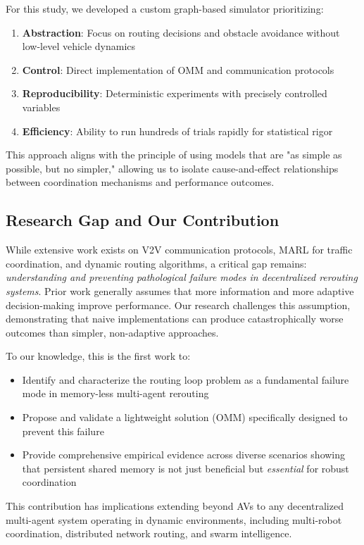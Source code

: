 \documentclass[conference]{IEEEtran}
\begin{document}
For this study, we developed a custom graph-based simulator prioritizing:
\begin{enumerate}
    \item \textbf{Abstraction}: Focus on routing decisions and obstacle avoidance without low-level vehicle dynamics
    \item \textbf{Control}: Direct implementation of OMM and communication protocols
    \item \textbf{Reproducibility}: Deterministic experiments with precisely controlled variables
    \item \textbf{Efficiency}: Ability to run hundreds of trials rapidly for statistical rigor
\end{enumerate}

This approach aligns with the principle of using models that are "as simple as possible, but no simpler," allowing us to isolate cause-and-effect relationships between coordination mechanisms and performance outcomes.

\subsection{Research Gap and Our Contribution}

While extensive work exists on V2V communication protocols, MARL for traffic coordination, and dynamic routing algorithms, a critical gap remains: \textit{understanding and preventing pathological failure modes in decentralized rerouting systems}. Prior work generally assumes that more information and more adaptive decision-making improve performance. Our research challenges this assumption, demonstrating that naive implementations can produce catastrophically worse outcomes than simpler, non-adaptive approaches.

To our knowledge, this is the first work to:
\begin{itemize}
    \item Identify and characterize the routing loop problem as a fundamental failure mode in memory-less multi-agent rerouting
    \item Propose and validate a lightweight solution (OMM) specifically designed to prevent this failure
    \item Provide comprehensive empirical evidence across diverse scenarios showing that persistent shared memory is not just beneficial but \textit{essential} for robust coordination
\end{itemize}

This contribution has implications extending beyond AVs to any decentralized multi-agent system operating in dynamic environments, including multi-robot coordination, distributed network routing, and swarm intelligence.
\end{document}
